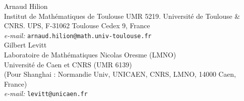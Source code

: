 \documentclass[11pt]{amsart}
\theoremstyle{remark}
\begin{document}
\bigskip\bigskip
\small
{\begin{flushleft}
Arnaud Hilion\\
Institut de Math\'ematiques de Toulouse UMR 5219. Universit\'e de Toulouse \& CNRS. UPS, F-31062 Toulouse Cedex 9, France\\
\emph{e-mail: }\texttt{arnaud.hilion@math.univ-toulouse.fr}\\[8mm]




Gilbert Levitt\\
Laboratoire de Math\'ematiques Nicolas Oresme (LMNO)\\
Universit\'e de Caen et CNRS (UMR 6139)\\
(Pour Shanghai : Normandie Univ, UNICAEN, CNRS, LMNO, 14000 Caen, France)\\
 \emph{e-mail: }\texttt{levitt@unicaen.fr}\\[8mm]

\end{flushleft}
}

 
\end{document}
